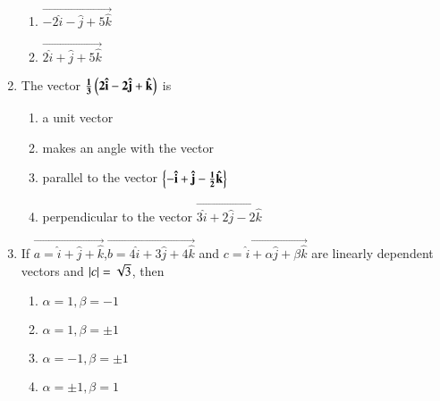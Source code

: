 \documentclass[journal,12pt,twocolumn]{IEEEtran}
\theoremstyle{remark}
\begin{document}
\begin{enumerate}
\begin{enumerate}
			\item $\vec{-2\hat{i}-\hat{j}+5\hat{k}}$
			\item $\vec{2\hat{i}+\hat{j}+5\hat{k}}$
		\end{enumerate}
\item %
	The vector $\mathbf{\frac{1}{3}\left(2\hat{i}-2\hat{j}+\hat{k}\right)}$ is \hfill{}\\
		\begin{enumerate}
			\item a unit vector
			\item makes an angle with the vector
			\item parallel to the vector $\mathbf{\left\{-\hat{i}+\hat{j}-\frac{1}{2}\hat{k}\right\}}$
			\item perpendicular to the vector $\vec{3\hat{i}+2\hat{j}-2\hat{k}}$
                \end{enumerate}
\item %
	If $\vec{a=\hat{i}+\hat{j}+\hat{k}}$,$\vec{b=4\hat{i}+3\hat{j}+4\hat{k}}$ and $\vec{c=\hat{i}+\alpha\hat{j}+\beta\hat{k}}$ are linearly dependent vectors and $\left\vert c\right\vert=\sqrt{3}$, then \hfill{}\\
		\begin{enumerate}
			\item $\alpha=1,\beta=-1$
			\item $\alpha=1,\beta=\pm1$
			\item $\alpha=-1,\beta=\pm1$
			\item $\alpha=\pm1,\beta=1$
		\end{enumerate}
\end{enumerate}
\end{document}
